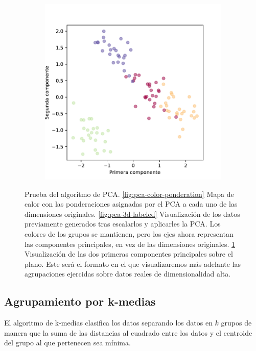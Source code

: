 \begin{figure}[]
\begin{subfigure}{0.45\textwidth}
    \includegraphics[width=\textwidth]{figures/pca-labeled.pdf}
    \caption{}
    \label{fig:pca-labeled}
  \end{subfigure}
  \caption[Prueba del algoritmo de PCA.]{Prueba del algoritmo de PCA. \ref{fig:pca-color-ponderation} Mapa de calor con las ponderaciones asignadas por el PCA a cada uno de las dimensiones originales. \ref{fig:pca-3d-labeled} Visualización de los datos previamente generados tras escalarlos y aplicarles la PCA. Los colores de los grupos se mantienen, pero los ejes ahora representan las componentes principales, en vez de las dimensiones originales. \ref{fig:pca-labeled} Visualización de las dos primeras componentes principales sobre el plano. Este será el formato en el que visualizaremos más adelante las agrupaciones ejercidas sobre datos reales de dimensionalidad alta.}
  \label{fig:pca}
\end{figure}

\newpage
\subsection{Agrupamiento por k-medias}

El algoritmo de k-medias clasifica los datos separando los datos en $ k $ grupos de manera que la suma de las distancias al cuadrado entre los datos y el centroide del grupo al que pertenecen sea mínima.

